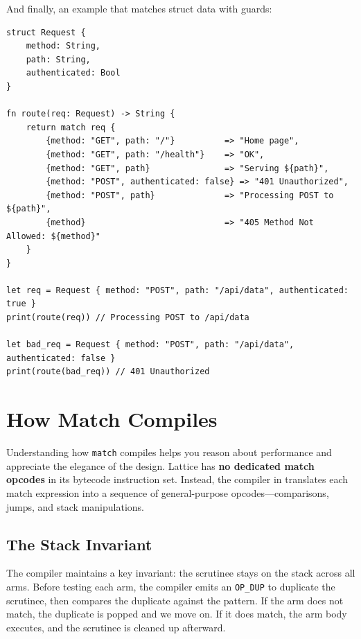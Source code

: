 And finally, an example that matches struct data with guards:

\begin{lstlisting}[language=Lattice, caption={Struct matching for access control}]
struct Request {
    method: String,
    path: String,
    authenticated: Bool
}

fn route(req: Request) -> String {
    return match req {
        {method: "GET", path: "/"}          => "Home page",
        {method: "GET", path: "/health"}    => "OK",
        {method: "GET", path}               => "Serving ${path}",
        {method: "POST", authenticated: false} => "401 Unauthorized",
        {method: "POST", path}              => "Processing POST to ${path}",
        {method}                            => "405 Method Not Allowed: ${method}"
    }
}

let req = Request { method: "POST", path: "/api/data", authenticated: true }
print(route(req)) // Processing POST to /api/data

let bad_req = Request { method: "POST", path: "/api/data", authenticated: false }
print(route(bad_req)) // 401 Unauthorized
\end{lstlisting}

\section{How Match Compiles}\label{sec:match-internals}

Understanding how \lstinline|match| compiles helps you reason about performance and appreciate the elegance of the design. Lattice has \textbf{no dedicated match opcodes} in its bytecode instruction set. Instead, the compiler in  translates each match expression into a sequence of general-purpose opcodes---comparisons, jumps, and stack manipulations.

\subsection{The Stack Invariant}\label{sec:stack-invariant}

The compiler maintains a key invariant: the scrutinee stays on the stack across all arms. Before testing each arm, the compiler emits an \lstinline|OP_DUP| to duplicate the scrutinee, then compares the duplicate against the pattern. If the arm does not match, the duplicate is popped and we move on. If it does match, the arm body executes, and the scrutinee is cleaned up afterward.

